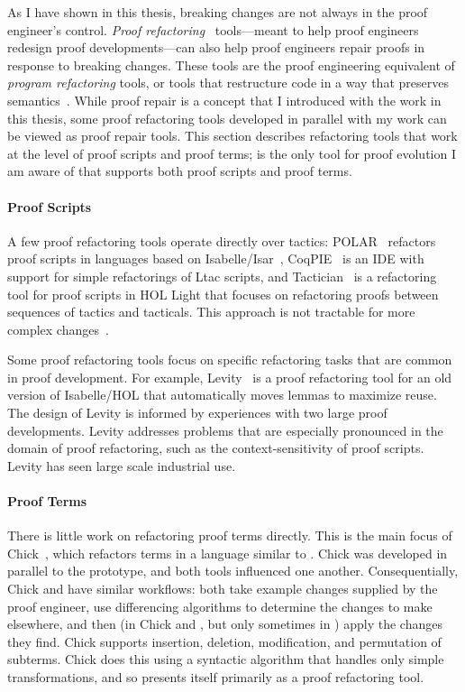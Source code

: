 As I have shown in this thesis, breaking changes are not always in the proof engineer's control.
\textit{Proof refactoring}~\cite{WhitesidePhD} tools---meant to help proof engineers redesign proof developments---can also help proof engineers
repair proofs in response to breaking changes.
These tools are the proof engineering equivalent of \textit{program refactoring} tools, or tools
that restructure code in a way that preserves semantics~\cite{opdyke1992}.
While proof repair is a concept that I introduced with the work in this thesis,
some proof refactoring tools developed in parallel with my work can be viewed as proof repair tools.
This section describes refactoring tools that work at the level of proof scripts and proof terms;
\toolnamec is the only tool for proof evolution I am aware of that supports both proof scripts and proof terms.

\paragraph{Proof Scripts}
A few proof refactoring tools operate directly over tactics:
\textsc{POLAR}~\cite{Dietrich2013} refactors proof scripts in languages based on Isabelle/Isar~\cite{Wenzel2007isar},
CoqPIE~\cite{Roe2016} is an IDE with support for simple refactorings of Ltac scripts, and
Tactician~\cite{adams2015} is a refactoring tool for proof scripts in HOL Light
that focuses on refactoring proofs between sequences of tactics and tacticals.
This approach is not tractable for more complex changes~\cite{robert2018}.

Some proof refactoring tools focus on specific refactoring tasks that are common in proof development.
For example, Levity~\cite{Bourke12} is a proof refactoring tool for an old version of Isabelle/HOL that automatically
moves lemmas to maximize reuse. The design of Levity is informed by experiences with two large proof developments.
Levity addresses problems that are especially pronounced in the domain of proof refactoring, such as the
context-sensitivity of proof scripts. Levity has seen large scale industrial use.
 
\paragraph{Proof Terms}
There is little work on refactoring proof terms directly. This is the main focus of Chick~\cite{robert2018}, 
which refactors terms in a language similar to .
Chick was developed in parallel to the \sysname prototype, and both tools influenced one another.
Consequentially, Chick and \sysnamelong have similar workflows:
both take example changes supplied by the proof engineer,
use differencing algorithms to determine the changes to make elsewhere,
and then (in Chick and \toolnamec, but only sometimes in \sysname) apply the changes they find. 
Chick supports insertion, deletion, modification, and permutation of subterms.
Chick does this using a syntactic algorithm that handles only simple transformations,
and so presents itself primarily as a proof refactoring tool.

